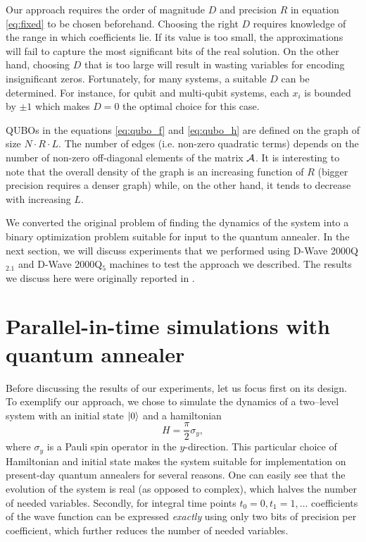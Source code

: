 Our approach requires the order of magnitude $D$ and precision $R$ in equation
\eqref{eq:fixed} to be chosen beforehand. Choosing the right $D$ requires
knowledge of the range in which coefficients lie. If its value is too small,
the approximations will fail to capture the most significant bits of the real
solution. On the other hand, choosing $D$ that is too large will result in
wasting variables for encoding insignificant zeros. Fortunately, for many
systems, a suitable $D$ can be determined. For instance, for qubit and
multi-qubit systems, each $x_i$ is bounded by $\pm 1$ which makes $D=0$ the
optimal choice for this case.

QUBOs in the equations \eqref{eq:qubo_f} and \eqref{eq:qubo_h} are defined on
the graph of size $N \cdot R \cdot L$. The number of edges (i.e. non-zero
quadratic terms) depends on the number of non-zero off-diagonal elements of the
matrix $\mathcal{A}$. It is interesting to note that the overall density of the
graph is an increasing function of $R$ (bigger precision requires a denser
graph) while, on the other hand, it tends to decrease with increasing $L$.

We converted the original problem of finding the dynamics of the system into a
binary optimization problem suitable for input to the quantum annealer. In the
next section, we will discuss experiments that we performed using D-Wave
2000Q$_{2.1}$ and D-Wave 2000Q$_5$ machines to test the approach we described.
The results we discuss here were originally reported in \cite{parallelintime}.

\section{Parallel-in-time simulations with quantum annealer}
Before discussing the results of our experiments, let us focus first on its
design. To exemplify our approach, we chose to simulate the dynamics of a
two--level system with an initial state $\ket{0}$ and a hamiltonian $$ H =
  \frac{\pi}{2}\sigma_y, $$ where $\sigma_y$ is a Pauli spin operator in the
$y$-direction. This particular choice of Hamiltonian and initial state makes
the system suitable for implementation on present-day quantum annealers for
several reasons. One can easily see that the evolution of the system is real
(as opposed to complex), which halves the number of needed variables. Secondly,
for integral time points $t_0=0, t_1=1, \ldots$ coefficients of the wave
function can be expressed \emph{exactly} using only two bits of precision per
coefficient, which further reduces the number of needed variables.

